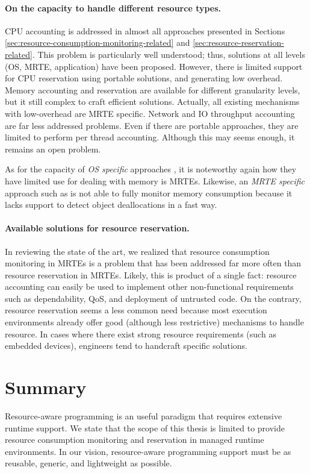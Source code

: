 \paragraph{On the capacity to handle different resource types.}
CPU accounting is addressed in almost all approaches presented in Sections \ref{sec:resource-consumption-monitoring-related} and \ref{sec:resource-reservation-related}.
This problem is particularly well understood; thus, solutions at all levels (OS, MRTE, application) have been proposed.
However, there is limited support for CPU reservation using portable solutions, and generating low overhead.
Memory accounting and reservation are available for different granularity levels, but it still complex to craft efficient solutions.
Actually, all existing mechanisms with low-overhead are MRTE specific.
Network and IO throughput accounting are far less addressed problems.
Even if there are portable approaches, they are limited to perform per thread accounting.
Although this may seems enough, it remains an open problem.

As for the capacity of \textit{OS specific} approaches \cite{Banga:1999:RCN:296806.296810,Kamp00jails:confining, Soltesz:2007:COS:1272998.1273025}, it is noteworthy again how they have limited use for dealing with memory is MRTEs.
Likewise, an \textit{MRTE specific} approach such as \cite{Lengauer:2015:AEO:2668930.2688037} is not able to fully monitor memory consumption because it lacks support to detect object deallocations in a fast way.

\paragraph{Available solutions for resource reservation.}
In reviewing the state of the art, we realized that resource consumption monitoring in MRTEs is a problem that has been addressed far more often than resource reservation in MRTEs.
Likely, this is product of a single fact: resource accounting can easily be used to implement other non-functional requirements such as dependability, QoS, and deployment of untrusted code.
On the contrary, resource reservation seems a less common need because most execution environments already offer good (although less restrictive) mechanisms to handle resource.
In cases where there exist strong resource requirements (such as embedded devices), engineers tend to handcraft specific solutions.


\section{Summary}
Resource-aware programming is an useful paradigm that requires extensive runtime support.
We state that the scope of this thesis is limited to provide resource consumption monitoring and reservation in managed runtime environments.
In our vision, resource-aware programming support must be as reusable, generic, and lightweight as possible.

